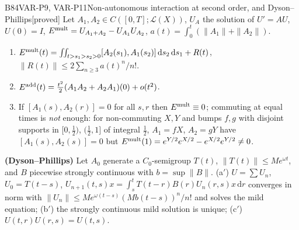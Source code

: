 \documentclass[11pt,a4paper,oneside]{report}
\newcommand{\badge}[2]{\textcolor{#1}{\textsf{\footnotesize[#2]}}}
\newcommand{\proved}{\badge{cC}{proved}}
\newcommand{\dd}{\,\mathrm{d}}
\newenvironment{dimcard}[5]{\par\Needspace{12\baselineskip}\begin{dimcardbox}{#1}{#2}{#3}{#4}{#5}}{\end{dimcardbox}}
\begin{document}
\begin{dimcard}{B84}{VAR-P9, VAR-P11}{Non-autonomous interaction at second order, and Dyson--Phillips}{\proved}{}
Let $A_1,A_2\in C([0,T];\mathcal L(X))$, $U_A$ the solution of $U'=AU$, $U(0)=I$, $E^{\rm mult}=U_{A_1+A_2}-U_{A_1}U_{A_2}$, $a(t)=\int_0^t(\|A_1\|+\|A_2\|)$.
\begin{enumerate}[label=(\alph*)]
\item $E^{\rm mult}(t)=\iint_{t>s_1>s_2>0}[A_2(s_1),A_1(s_2)]\dd s_2\dd s_1+R(t)$, $\|R(t)\|\le2\sum_{n\ge3}a(t)^n/n!$.
\item $E^{\rm add}(t)=\frac{t^2}2(A_1A_2+A_2A_1)(0)+o(t^2)$.
\item If $[A_1(s),A_2(r)]=0$ for all $s,r$ then $E^{\rm mult}\equiv0$; commuting at equal times is \emph{not} enough: for non-commuting $X,Y$ and bumps $f,g$ with disjoint supports in $[0,\tfrac12)$, $(\tfrac12,1]$ of integral $\tfrac12$, $A_1=fX$, $A_2=gY$ have $[A_1(s),A_2(s)]=0$ but $E^{\rm mult}(1)=e^{Y/2}e^{X/2}-e^{X/2}e^{Y/2}\ne0$.
\end{enumerate}
\textbf{(Dyson--Phillips)} Let $A_0$ generate a $C_0$-semigroup $T(t)$, $\|T(t)\|\le Me^{\omega t}$, and $B$ piecewise strongly continuous with $b=\sup\|B\|$. (a$'$) $U=\sum U_n$, $U_0=T(t-s)$, $U_{n+1}(t,s)x=\int_s^tT(t-r)B(r)U_n(r,s)x\dd r$ converges in norm with $\|U_n\|\le Me^{\omega(t-s)}(Mb(t-s))^n/n!$ and solves the mild equation; (b$'$) the strongly continuous mild solution is unique; (c$'$) $U(t,r)U(r,s)=U(t,s)$.
\end{dimcard}
\end{document}
